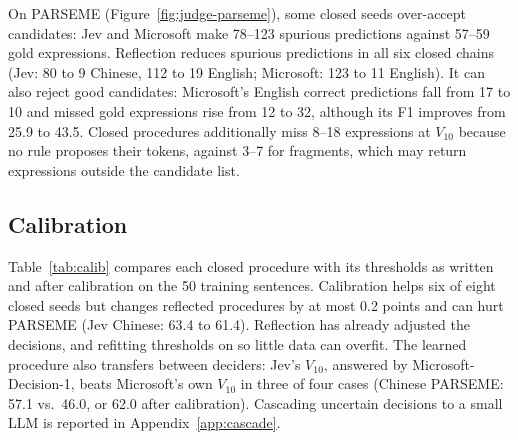 On PARSEME (Figure~\ref{fig:judge-parseme}), some closed seeds over-accept candidates: Jev and Microsoft make 78--123 spurious predictions against 57--59 gold expressions. Reflection reduces spurious predictions in all six closed chains (Jev: 80 to 9 Chinese, 112 to 19 English; Microsoft: 123 to 11 English). It can also reject good candidates: Microsoft's English correct predictions fall from 17 to 10 and missed gold expressions rise from 12 to 32, although its F1 improves from 25.9 to 43.5. Closed procedures additionally miss 8--18 expressions at $V_{10}$ because no rule proposes their tokens, against 3--7 for fragments, which may return expressions outside the candidate list.

\subsection{Calibration}
\label{sec:res-calib}

\begin{table}[t]
\centering\tiny
\setlength{\tabcolsep}{4pt}

\caption{Closed procedures with their thresholds as written (raw) and calibrated on the 50 training sentences (cal.). 
}
\label{tab:calib}
\end{table}

Table~\ref{tab:calib} compares each closed procedure with its thresholds as written and after calibration on the 50 training sentences. Calibration helps six of eight closed seeds but changes reflected \umr procedures by at most 0.2 points and can hurt PARSEME (Jev Chinese: 63.4 to 61.4). Reflection has already adjusted the decisions, and refitting thresholds on so little data can overfit. The learned procedure also transfers between deciders: Jev's $V_{10}$, answered by Microsoft-Decision-1, beats Microsoft's own $V_{10}$ in three of four cases (Chinese PARSEME: 57.1 vs.\ 46.0, or 62.0 after calibration). Cascading uncertain decisions to a small LLM is reported in Appendix~\ref{app:cascade}.
